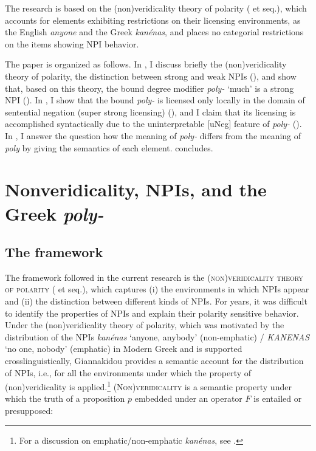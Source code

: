 \documentclass[output=paper]{langscibook}
\begin{document}
The research is based on the (non)veridicality theory of polarity (\citealt{giannaki1997dissert,giannaki1998,giannaki2001free} et seq.), which accounts for elements exhibiting restrictions on their licensing environments, as the English \textit{anyone} and the Greek \textit{kanénas}, and places no categorial restrictions on the items showing NPI behavior.

The paper is organized as follows. In , I discuss briefly the (non)veridicality theory of polarity, the distinction between strong and weak NPIs (), and show that, based on this theory, the bound degree modifier \textit{poly-} ‘much’ is a strong NPI (). In , I show that the bound \textit{poly-} is licensed only locally in the domain of sentential negation (super strong licensing) (), and I claim that its licensing is accomplished syntactically due to the uninterpretable [uNeg] feature of \textit{poly-} (). In , I answer the question how the meaning of \textit{poly-} differs from the meaning of \textit{poly} by giving the semantics of each element.  concludes.

\section{Nonveridicality, NPIs, and the Greek \textit{poly-}}\label{gia:sec:nonveridicality}

\subsection{The framework} \label{gia:sub:framework}

The framework followed in the current research is the \textsc{(non)veridicality theory of polarity} (\citealt{giannakidou1994licensing,giannaki1997dissert,giannaki2001free} et seq.), which captures (i) the environments in which NPIs appear and (ii) the distinction between different kinds of NPIs. For years, it was difficult to identify the properties of NPIs and explain their polarity sensitive behavior. Under the (non)veridicality theory of polarity, which was motivated by the distribution of the NPIs \textit{kanénas} `anyone, anybody' (non-emphatic) / \textit{KANENAS} `no one, nobody' (emphatic) in Modern Greek and is supported crosslinguistically, Giannakidou provides a semantic account for the distribution of NPIs, i.e., for all the environments under which the property of (non)veridicality is applied.\footnote{For a discussion on emphatic/non-emphatic \textit{kanénas}, see \citet{giannaki1997dissert, giannaki1998, giannaki2000n}.} \textsc{(Non)veridicality} is a semantic property under which the truth of a proposition $p$ embedded under an operator $F$ is entailed or presupposed:
\end{document}
